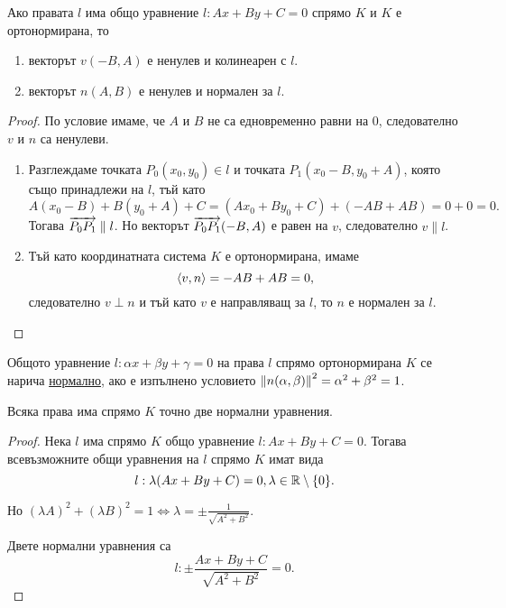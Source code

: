 \documentclass[numbers=endperiod, DIV=15]{scrartcl}
\begin{document}
\begin{proposition}
  Ако правата $l$ има общо уравнение $l: Ax + By + C = 0$ спрямо $K$ и $K$ е ортонормирана, то
  \begin{enumerate}
    \item векторът $v(-B, A)$ е ненулев и колинеарен с $l$.
    \item векторът $n(A, B)$ е ненулев и нормален за $l$.
  \end{enumerate}
\end{proposition}
\begin{proof}
  По условие имаме, че $A$ и $B$ не са едновременно равни на $0$, следователно $v$ и $n$ са ненулеви.
  \begin{enumerate}
    \item Разглеждаме точката $P_0(x_0, y_0) \in l$ и точката $P_1(x_0 - B, y_0 + A)$, която също принадлежи на $l$, тъй като
    \begin{displaymath}
      A(x_0 - B) + B(y_0 + A) + C = (Ax_0 + By_0 + C) + (-AB + AB) = 0 + 0 = 0.
    \end{displaymath}
     Тогава $\overrightarrow{P_0 P_1} \parallel l$. Но векторът $\overrightarrow{P_0 P_1}(-B, A)$ е равен на $v$, следователно $v \parallel l$.

    \item Тъй като координатната система $K$ е ортонормирана, имаме
    \begin{displaymath}
      \left\langle v, n \right\rangle = -AB + AB = 0,
    \end{displaymath}
    следователно $v \perp n$ и тъй като $v$ е направляващ за $l$, то $n$ е нормален за $l$.
  \end{enumerate}
\end{proof}

\begin{definition}
  Общото уравнение $l: \alpha x + \beta y + \gamma = 0$ на права $l$ спрямо ортонормирана $K$ се нарича \underline{нормално}, ако е изпълнено условието $\left\Vert n(\alpha, \beta) \right\Vert^2 = \alpha^2 + \beta^2 = 1$.
\end{definition}

\begin{proposition}
  Всяка права има спрямо $K$ точно две нормални уравнения.
\end{proposition}
\begin{proof}
  Нека $l$ има спрямо $K$ общо уравнение $l: Ax + By + C = 0$. Тогава всевъзможните общи уравнения на $l$ спрямо $K$ имат вида
  \begin{displaymath}
    l: \lambda(Ax + By + C) = 0, \lambda \in \mathbb{R} \setminus \{ 0 \}.
  \end{displaymath}

  Но ${(\lambda A)}^2 + {(\lambda B)}^2 = 1 \iff \lambda = \pm \frac 1 {\sqrt{A^2 + B^2}}$.

  Двете нормални уравнения са
  \begin{displaymath}
    l: \pm \frac {Ax + By + C} {\sqrt{A^2 + B^2}} = 0.
  \end{displaymath}
\end{proof}
\end{document}
